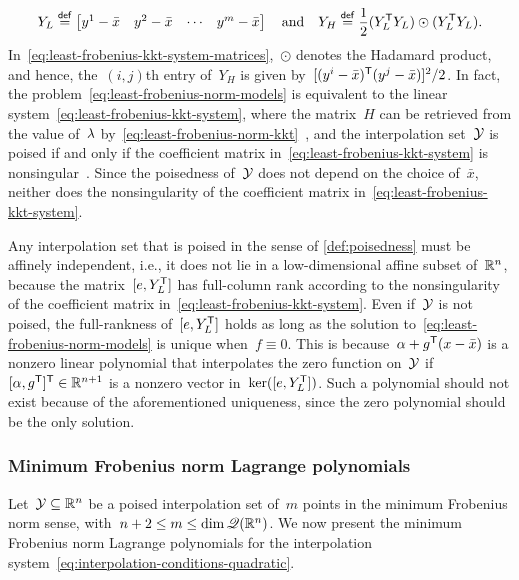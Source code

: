 \begin{equation}
    \label{eq:least-frobenius-kkt-system-matrices}
    Y_L \mathrel{\stackrel{\mathsf{def}}{=}} 
    \begin{bmatrix}
        y^1 - \bar{x}   & y^2 - \bar{x} & \cdots    & y^m - \bar{x}
    \end{bmatrix} \quad \text{and} \quad Y_H \mathrel{\stackrel{\mathsf{def}}{=}} \frac{1}{2} (Y_L^{\mathsf{T}} Y_L) \odot (Y_L^{\mathsf{T}} Y_L).
\end{equation}
%
In~\cref{eq:least-frobenius-kkt-system-matrices},~$\odot$ denotes the Hadamard product, and hence, the~$(i, j)$th entry of~$Y_H$ is given by~$[(y^i - \bar{x})^{\mathsf{T}} (y^j - \bar{x})]^2 / 2$.
In fact, the problem~\cref{eq:least-frobenius-norm-models} is equivalent to the linear system~\cref{eq:least-frobenius-kkt-system}, where the matrix~$H$ can be retrieved from the value of~$\lm$ by~\cref{eq:least-frobenius-norm-kkt}~\cite[\S~2]{Powell_2004b}, and the interpolation set~$\xpt$ is poised if and only if the coefficient matrix in~\cref{eq:least-frobenius-kkt-system} is nonsingular~\cite[\S~5.3]{Conn_Scheinberg_Vicente_2009b}.
Since the poisedness of~$\xpt$ does not depend on the choice of~$\bar{x}$, neither does the nonsingularity of the coefficient matrix in~\cref{eq:least-frobenius-kkt-system}.

Any interpolation set that is poised in the sense of \cref{def:poisedness} must be affinely independent, i.e., it does not lie in a low-dimensional affine subset of~$\mathbb{R}^n$, because the matrix~$[e, Y_L^{\mathsf{T}}]$ has full-column rank according to the nonsingularity of the coefficient matrix in~\cref{eq:least-frobenius-kkt-system}.
Even if~$\xpt$ is not poised, the full-rankness of~$[e, Y_L^{\mathsf{T}}]$ holds as long as the solution to~\cref{eq:least-frobenius-norm-models} is unique when~$f \equiv 0$.
This is because~$\alpha + g^{\T} (\iter - \bar{x})$ is a nonzero linear polynomial that interpolates the zero function on~$\xpt$ if~$[\alpha, g^{\mathsf{T}}]^{\mathsf{T}} \in \mathbb{R}^{n + 1}$ is a nonzero vector in~$\ker([e, Y_L^{\mathsf{T}}])$.
Such a polynomial should not exist because of the aforementioned uniqueness, since the zero polynomial should be the only solution.

\subsubsection{Minimum Frobenius norm Lagrange polynomials}

Let~$\xpt \subseteq \R^n$ be a poised interpolation set of~$m$ points in the minimum Frobenius norm sense, with~$n + 2 \le m \le \dim \mathscr{Q}(\mathbb{R}^n)$.
We now present the minimum Frobenius norm Lagrange polynomials for the interpolation system~\cref{eq:interpolation-conditions-quadratic}.

